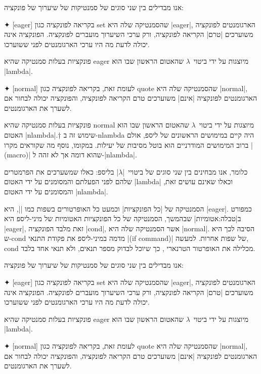 אנו מבדילים בין שני סוגים של סמנטיקות של שיערוך של פונקציה:
\begin{description}
  ✦ [eager] בקריאה לפונקציה כגון set שהסמנטיקה שלה היא \E|eager|, הארגומנטים
  לפונקציה משוערכים \ע|טרם| הקריאה לפונקציה, ורק ערכי השיערוך מועברים לפונקציה.
  הפונקציה אינה יכולה לדעת מה היו ערכי הארגומנטים לפני ששוערכו.

  פונקציות בעלות סמנטיקה שהיא eager מיוצגות על ידי ביטוי~$λ$ שהאטום הראשון שבו
  הוא \T|lambda|.

  ✦ [normal] לעומת זאת, בקריאה לפונקציה כגון quote שהסמנטיקה שלה היא
  \E|normal|, הארגומנטים לפונקציה \ע|אינם| משוערכים טרם הקריאה לפונקציה,
  והפונקציה יכולה לבחור אם לשערך את הארגומנטים.

  פונקציות בעלות סמנטיקה שהיא normal מיוצגות על ידי ביטוי~$λ$ שהאטום הראשון שבו
  הוא האטום \T|nlambda|.†{%
  שימוש זה ב-nlambda היה קיים במימושים הראשונים של ליספ, אולם ברוב המימושים המודרניים
  הוא בוטל מסיבות של יעילות. במקומו, נוסף מה שקוראים מקרו \E|(macro)|
  שהוא דומה אך לא זהה ל-\E|nlambda|.}

  כלומר, אנו מבחינים בין שני סוגים של ביטויי~\E|$λ$| בליספ: כאלו שמשערכים את
  הפרמטרים שלהם לפני הפעלתם והמסומנים על ידי האטום \T|lambda| וכאלו שאינם עושים
  זאת, והמסומנים על ידי האטום \T|nlambda|.
\end{description}

הסמנטיקה של \ע|כל הפונקציות| וכמעט כל האופרטורים בשפות כמו \E|\CPL|, היא
\E|eager|. כמפורט ב|טבלה:אטומיות| שבהמשך, הסמנטיקה של כל הפונקציות
האטומיות של מיני-ליספ היא \E|eager|, זאת מלבד הפונקציה \E|cond|, אשר הסמנטיקה
שלה היא \E|normal|. הסיבה לכך היא ש-cond מדמה במיני-ליספ את פקודת התנאי \E|(if
command)| של שפות אחרות. למעשה, cond מכלילה את האופרטור הטרנארי
, כך שיוכל לבדוק מספר תנאים, ולא תנאי אחד בלבד.

אנו מבדילים בין שני סוגים של סמנטיקות של שיערוך של פונקציה:
\begin{description}
  ✦ [eager] בקריאה לפונקציה כגון set שהסמנטיקה שלה היא \E|eager|, הארגומנטים
  לפונקציה משוערכים \ע|טרם| הקריאה לפונקציה, ורק ערכי השיערוך מועברים לפונקציה.
  הפונקציה אינה יכולה לדעת מה היו ערכי הארגומנטים לפני ששוערכו.

  פונקציות בעלות סמנטיקה שהיא eager מיוצגות על ידי ביטוי~$λ$ שהאטום הראשון שבו
  הוא \T|lambda|.

  ✦ [normal] לעומת זאת, בקריאה לפונקציה כגון quote שהסמנטיקה שלה היא
  \E|normal|, הארגומנטים לפונקציה \ע|אינם| משוערכים טרם הקריאה לפונקציה,
  והפונקציה יכולה לבחור אם לשערך את הארגומנטים.
  \end{description}
 

